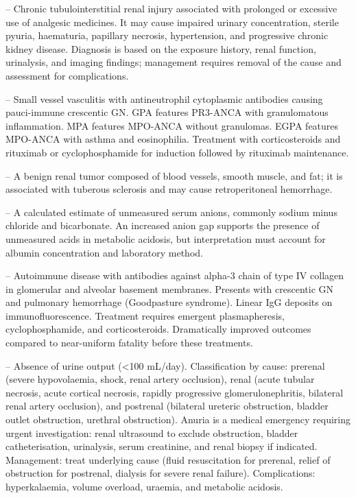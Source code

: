 -- Chronic tubulointerstitial renal injury associated with prolonged or excessive use of analgesic medicines. It may cause impaired urinary concentration, sterile pyuria, haematuria, papillary necrosis, hypertension, and progressive chronic kidney disease. Diagnosis is based on the exposure history, renal function, urinalysis, and imaging findings; management requires removal of the cause and assessment for complications.

-- Small vessel vasculitis with antineutrophil cytoplasmic antibodies causing pauci-immune crescentic GN. GPA features PR3-ANCA with granulomatous inflammation. MPA features MPO-ANCA without granulomas. EGPA features MPO-ANCA with asthma and eosinophilia. Treatment with corticosteroids and rituximab or cyclophosphamide for induction followed by rituximab maintenance.

-- A benign renal tumor composed of blood vessels, smooth muscle, and fat; it is associated with tuberous sclerosis and may cause retroperitoneal hemorrhage.

-- A calculated estimate of unmeasured serum anions, commonly sodium minus chloride and bicarbonate. An increased anion gap supports the presence of unmeasured acids in metabolic acidosis, but interpretation must account for albumin concentration and laboratory method.

-- Autoimmune disease with antibodies against alpha-3 chain of type IV collagen in glomerular and alveolar basement membranes. Presents with crescentic GN and pulmonary hemorrhage (Goodpasture syndrome). Linear IgG deposits on immunofluorescence. Treatment requires emergent plasmapheresis, cyclophosphamide, and corticosteroids. Dramatically improved outcomes compared to near-uniform fatality before these treatments.

-- Absence of urine output (<100 mL/day). Classification by cause: prerenal (severe hypovolaemia, shock, renal artery occlusion), renal (acute tubular necrosis, acute cortical necrosis, rapidly progressive glomerulonephritis, bilateral renal artery occlusion), and postrenal (bilateral ureteric obstruction, bladder outlet obstruction, urethral obstruction). Anuria is a medical emergency requiring urgent investigation: renal ultrasound to exclude obstruction, bladder catheterisation, urinalysis, serum creatinine, and renal biopsy if indicated. Management: treat underlying cause (fluid resuscitation for prerenal, relief of obstruction for postrenal, dialysis for severe renal failure). Complications: hyperkalaemia, volume overload, uraemia, and metabolic acidosis.

